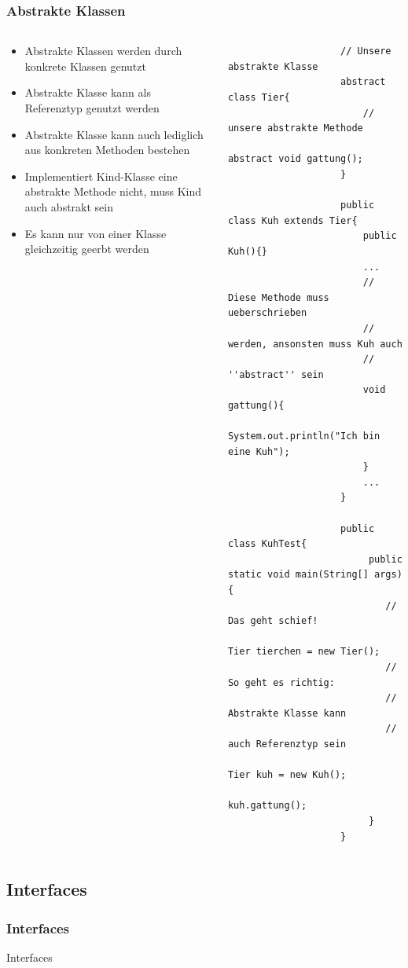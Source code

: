 \begin{frame}[fragile]
	\frametitle{Abstrakte Klassen}
		\begin{columns}
			\begin{column}{0.5\textwidth}
			\small
			\begin{itemize}
			  \item Abstrakte Klassen werden durch
			  konkrete Klassen genutzt
			  \item Abstrakte Klasse kann als Referenztyp
			  genutzt werden
			  \item Abstrakte Klasse kann auch lediglich
			  aus konkreten Methoden bestehen
			  \item Implementiert Kind-Klasse eine abstrakte
			  Methode nicht, muss Kind auch abstrakt sein
			  \item Es kann nur von einer Klasse gleichzeitig
			  geerbt werden
			\end{itemize}
			\end{column}
			\begin{column}{0.5\textwidth}
				\begin{lstlisting}
					// Unsere abstrakte Klasse
					abstract class Tier{
						// unsere abstrakte Methode
						abstract void gattung();
					}
					
					public class Kuh extends Tier{
						public Kuh(){}
						...
						// Diese Methode muss ueberschrieben
						// werden, ansonsten muss Kuh auch
						// ''abstract'' sein
						void gattung(){
							System.out.println("Ich bin eine Kuh");
						}
						...
					}
					
					public class KuhTest{
						 public static void main(String[] args){
						 	// Das geht schief!
						 	Tier tierchen = new Tier();
						 	// So geht es richtig:
						 	// Abstrakte Klasse kann 
						 	// auch Referenztyp sein
						 	Tier kuh = new Kuh();
						 	kuh.gattung(); 
						 }
					}
				\end{lstlisting}
			\end{column}
		\end{columns}
\end{frame}

\subsection{Interfaces}
\begin{frame}[fragile]
	\frametitle{Interfaces}
	\huge Interfaces
\end{frame}

